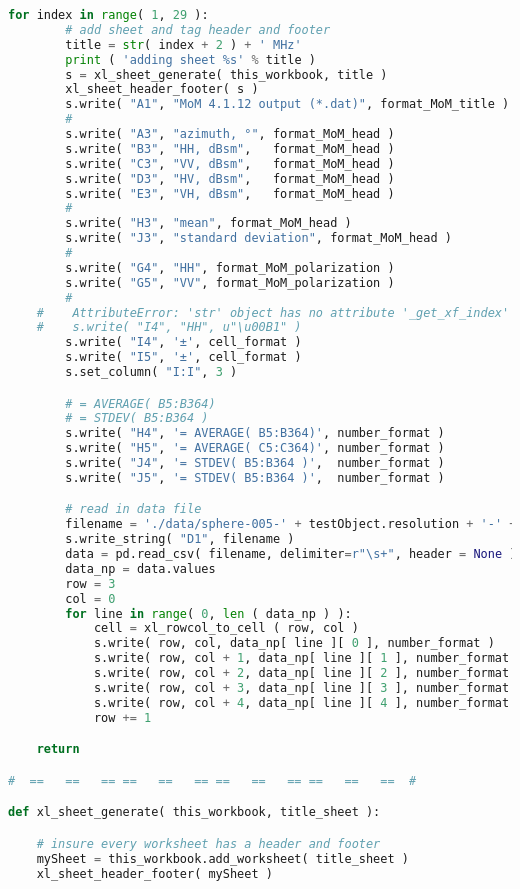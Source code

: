 {{\begin{lstlisting}[language=Python]
    for index in range( 1, 29 ):
        # add sheet and tag header and footer
        title = str( index + 2 ) + ' MHz'
        print ( 'adding sheet %s' % title )
        s = xl_sheet_generate( this_workbook, title )
        xl_sheet_header_footer( s )
        s.write( "A1", "MoM 4.1.12 output (*.dat)", format_MoM_title )
        #
        s.write( "A3", "azimuth, °", format_MoM_head )
        s.write( "B3", "HH, dBsm",   format_MoM_head )
        s.write( "C3", "VV, dBsm",   format_MoM_head )
        s.write( "D3", "HV, dBsm",   format_MoM_head )
        s.write( "E3", "VH, dBsm",   format_MoM_head )
        #
        s.write( "H3", "mean", format_MoM_head )
        s.write( "J3", "standard deviation", format_MoM_head )
        #
        s.write( "G4", "HH", format_MoM_polarization )
        s.write( "G5", "VV", format_MoM_polarization )
        #
    #    AttributeError: 'str' object has no attribute '_get_xf_index'
    #    s.write( "I4", "HH", u"\u00B1" )
        s.write( "I4", '±', cell_format )
        s.write( "I5", '±', cell_format )
        s.set_column( "I:I", 3 )

        # = AVERAGE( B5:B364)
        # = STDEV( B5:B364 )
        s.write( "H4", '= AVERAGE( B5:B364)', number_format )
        s.write( "H5", '= AVERAGE( C5:C364)', number_format )
        s.write( "J4", '= STDEV( B5:B364 )',  number_format )
        s.write( "J5", '= STDEV( B5:B364 )',  number_format )

        # read in data file
        filename = './data/sphere-005-' + testObject.resolution + '-' + str( index + 2 ).zfill(2) + '.4112.dat.txt'
        s.write_string( "D1", filename )
        data = pd.read_csv( filename, delimiter=r"\s+", header = None )
        data_np = data.values
        row = 3
        col = 0
        for line in range( 0, len ( data_np ) ):
            cell = xl_rowcol_to_cell ( row, col )
            s.write( row, col, data_np[ line ][ 0 ], number_format )
            s.write( row, col + 1, data_np[ line ][ 1 ], number_format )
            s.write( row, col + 2, data_np[ line ][ 2 ], number_format )
            s.write( row, col + 3, data_np[ line ][ 3 ], number_format )
            s.write( row, col + 4, data_np[ line ][ 4 ], number_format )
            row += 1

    return

#  ==   ==   == ==   ==   == ==   ==   == ==   ==   ==  #

def xl_sheet_generate( this_workbook, title_sheet ):

    # insure every worksheet has a header and footer
    mySheet = this_workbook.add_worksheet( title_sheet )
    xl_sheet_header_footer( mySheet )


\end{lstlisting}}}
